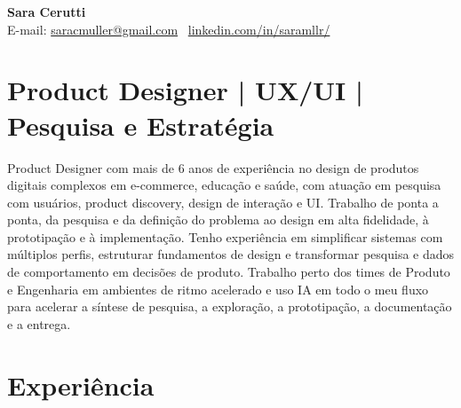\documentclass[a4paper,10pt]{article}
\begin{document}
\begin{center}
  {\LARGE\bfseries Sara Cerutti}\\[3pt]
  \small E-mail: \href{mailto:saracmuller@gmail.com}{saracmuller@gmail.com} \textbullet\ \href{https://linkedin.com/in/saramllr/}{linkedin.com/in/saramllr/}
\end{center}

\section{Product Designer | UX/UI | Pesquisa e Estratégia}
Product Designer com mais de 6 anos de experiência no design de produtos digitais complexos em e-commerce, educação e saúde, com atuação em pesquisa com usuários, product discovery, design de interação e UI. Trabalho de ponta a ponta, da pesquisa e da definição do problema ao design em alta fidelidade, à prototipação e à implementação. Tenho experiência em simplificar sistemas com múltiplos perfis, estruturar fundamentos de design e transformar pesquisa e dados de comportamento em decisões de produto. Trabalho perto dos times de Produto e Engenharia em ambientes de ritmo acelerado e uso IA em todo o meu fluxo para acelerar a síntese de pesquisa, a exploração, a prototipação, a documentação e a entrega.

\section{Experiência}
\end{document}

